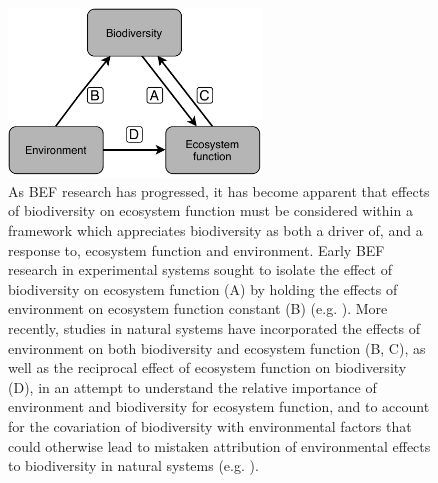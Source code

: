 \begin{refsection}
\begin{figure}
	\includegraphics[width=0.6\textwidth]{img/plas_befr}
	\caption[Schematic diagram of the interactions among biodiversity, environment, and ecosystem function]{As BEF research has progressed, it has become apparent that effects of biodiversity on ecosystem function must be considered within a framework which appreciates biodiversity as both a driver of, and a response to, ecosystem function and environment. Early BEF research in experimental systems sought to isolate the effect of biodiversity on ecosystem function (A) by holding the effects of environment on ecosystem function constant (B) (e.g. \citealt{Cardinale2009}). More recently, studies in natural systems have incorporated the effects of environment on both biodiversity and ecosystem function (B, C), as well as the reciprocal effect of ecosystem function on biodiversity (D), in an attempt to understand the relative importance of environment and biodiversity for ecosystem function, and to account for the covariation of biodiversity with environmental factors that could otherwise lead to mistaken attribution of environmental effects to biodiversity in natural systems (e.g. \citealt{Mora2014}).} 
	\label{background:plas_befr}
\end{figure}


\end{refsection}
